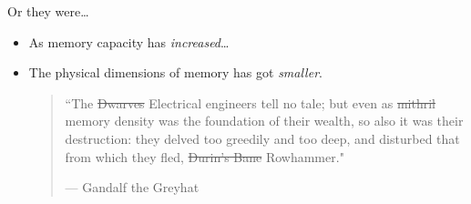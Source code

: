 \documentclass[9pt,aspectratio=169]{beamer}
\begin{document}
\begin{frame}[label={sec:org7101067}]{Or they were\ldots{}}
\begin{itemize}
\item As memory capacity has \emph{increased}\ldots{}
\item The physical dimensions of memory has got \emph{smaller}.

\vfill
\begin{quote}
``The \sout{Dwarves} \alert{Electrical engineers} tell no tale; but even as \sout{mithril}
\alert{memory density} was the foundation of their wealth, so also it was
their destruction: they delved too greedily and too deep, and
disturbed that from which they fled, \sout{Durin's Bane} \alert{Rowhammer}."

--- \alert{Gandalf the Greyhat}
\end{quote}
\end{itemize}
\end{frame}
\end{document}
